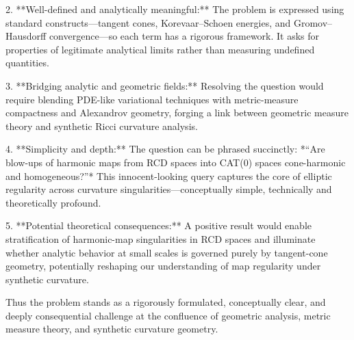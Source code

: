 2. **Well-defined and analytically meaningful:**  
   The problem is expressed using standard constructs—tangent cones, Korevaar–Schoen energies, and Gromov–Hausdorff convergence—so each term has a rigorous framework. It asks for properties of legitimate analytical limits rather than measuring undefined quantities.  

3. **Bridging analytic and geometric fields:**  
   Resolving the question would require blending PDE-like variational techniques with metric-measure compactness and Alexandrov geometry, forging a link between geometric measure theory and synthetic Ricci curvature analysis.  

4. **Simplicity and depth:**  
   The question can be phrased succinctly: *“Are blow-ups of harmonic maps from RCD spaces into CAT(0) spaces cone-harmonic and homogeneous?”*  
   This innocent-looking query captures the core of elliptic regularity across curvature singularities—conceptually simple, technically and theoretically profound.  

5. **Potential theoretical consequences:**  
   A positive result would enable stratification of harmonic-map singularities in RCD spaces and illuminate whether analytic behavior at small scales is governed purely by tangent-cone geometry, potentially reshaping our understanding of map regularity under synthetic curvature.  

Thus the problem stands as a rigorously formulated, conceptually clear, and deeply consequential challenge at the confluence of geometric analysis, metric measure theory, and synthetic curvature geometry.